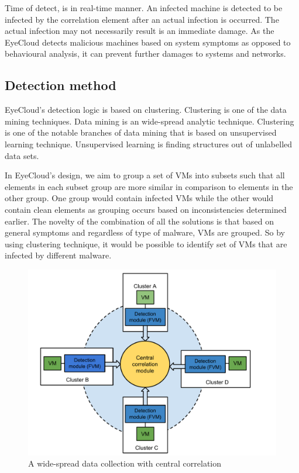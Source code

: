 \documentclass[conference]{IEEEtran}
\begin{document}
Time of detect, is in real-time manner. An infected machine is detected to be infected by the correlation element after an actual infection is occurred. The actual infection may not necessarily result is an immediate damage. As the EyeCloud detects malicious machines based on system symptoms as opposed to behavioural analysis, it can prevent further damages to systems and networks.  
\subsection{Detection method}
EyeCloud's detection logic is based on clustering. Clustering is one of the data mining techniques. Data mining is an wide-spread analytic technique. Clustering is one of the notable branches of data mining that is based on unsupervised learning technique. Unsupervised learning is finding structures out of unlabelled data sets. 

In EyeCloud's design, we aim to group a set of VMs into subsets such that all elements in each subset group are more similar in comparison to elements in the other group. One group would contain infected VMs while the other would contain clean elements as grouping occurs based on inconsistencies determined earlier. The novelty of the combination of all the solutions is that based on general symptoms and regardless of type of malware, VMs are grouped. So by using clustering technique, it would be possible to identify set of VMs that are infected by different malware. 

\begin{figure}
\begin{center}
\includegraphics[scale=0.6]{pic111.pdf}
\caption{A wide-spread data collection with central correlation}
\label{Fig:111}
\end{center}
\end{figure}
\end{document}
